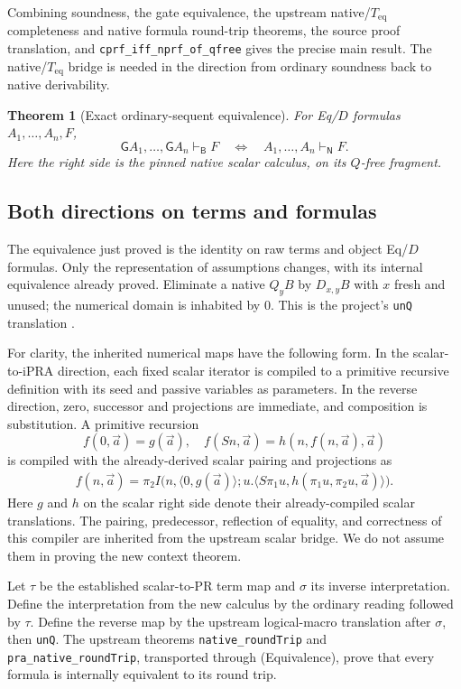 \documentclass[11pt]{article}
\newtheorem{theorem}{Theorem}[section]
\theoremstyle{definition}
\theoremstyle{remark}
\newcommand{\Bprf}{\mathsf{B}}
\newcommand{\Nprf}{\mathsf{N}}
\newcommand{\Teq}{T_{\mathrm{eq}}}
\newcommand{\gate}{\mathsf{G}}
\newcommand{\entB}{\vdash_{\Bprf}}
\begin{document}
Combining soundness, the gate equivalence, the upstream native/$\Teq$
completeness and native formula round-trip theorems, the source proof
translation, and \texttt{cprf\_iff\_nprf\_of\_qfree} gives the precise
main result. The native/$\Teq$ bridge is needed in the direction from
ordinary soundness back to native derivability.

\begin{theorem}[Exact ordinary-sequent equivalence]
For Eq/$D$ formulas $A_1,\ldots,A_n,F$,
\[
 \gate A_1,\ldots,\gate A_n\entB F
 \quad\Longleftrightarrow\quad
 A_1,\ldots,A_n\vdash_{\Nprf}F.
 \tag{Equivalence}
\]
Here the right side is the pinned native scalar calculus, on its
$Q$-free fragment.
\end{theorem}

\subsection{Both directions on terms and formulas}

The equivalence just proved is the identity on raw terms and object
Eq/$D$ formulas. Only the representation of assumptions changes, with
its internal equivalence already proved. Eliminate a native $Q_yB$ by
$D_{x,y}B$ with $x$ fresh and unused; the numerical domain is inhabited
by $0$. This is the project's \texttt{unQ} translation \cite{clausal}.

For clarity, the inherited numerical maps have the following form.
In the scalar-to-iPRA direction, each fixed scalar iterator is compiled
to a primitive recursive definition with its seed and passive variables
as parameters. In the reverse direction, zero, successor and projections
are immediate, and composition is substitution. A primitive recursion
\[
 f(0,\vec a)=g(\vec a),\quad
 f(Sn,\vec a)=h(n,f(n,\vec a),\vec a)
\]
is compiled with the already-derived scalar pairing and projections as
\begin{align*}
 f(n,\vec a)=\pi_2 I\bigl(n,\langle0,g(\vec a)\rangle;u.
 \langle S\pi_1u, h(\pi_1u,\pi_2u,\vec a)\rangle\bigr).
\end{align*}
Here $g$ and $h$ on the scalar right side denote their already-compiled
scalar translations. The pairing, predecessor, reflection of equality, and correctness of
this compiler are inherited from the upstream scalar bridge. We do not
assume them in proving the new context theorem.

Let $\tau$ be the established scalar-to-PR term map and $\sigma$ its
inverse interpretation. Define the interpretation from the new calculus
by the ordinary reading followed by $\tau$. Define the reverse map by
the upstream logical-macro translation after $\sigma$, then \texttt{unQ}.
The upstream theorems \texttt{native\_roundTrip} and
\texttt{pra\_native\_roundTrip}, transported through (Equivalence), prove
that every formula is internally equivalent to its round trip.
\end{document}
